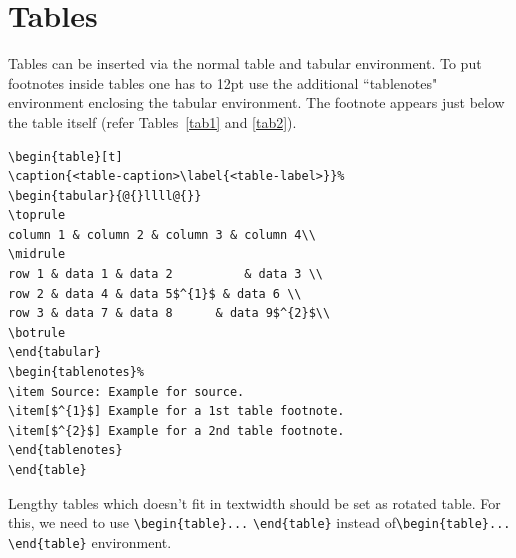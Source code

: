 \documentclass[numbers,webpdf]{ima-authoring-template}%
\theoremstyle{thmstyletwo}%
\numberwithin{equation}{section}
\begin{document}
\section{Tables}\label{sec5}

Tables can be inserted via the normal table and tabular environment. To put
footnotes inside tables one has to 12pt use the additional ``tablenotes" environment
enclosing the tabular environment. The footnote appears just below the table
itself (refer Tables~\ref{tab1} and \ref{tab2}).


\begin{verbatim}
\begin{table}[t]
\caption{<table-caption>\label{<table-label>}}%
\begin{tabular}{@{}llll@{}}
\toprule
column 1 & column 2 & column 3 & column 4\\
\midrule
row 1 & data 1 & data 2          & data 3 \\
row 2 & data 4 & data 5$^{1}$ & data 6 \\
row 3 & data 7 & data 8      & data 9$^{2}$\\
\botrule
\end{tabular}
\begin{tablenotes}%
\item Source: Example for source.
\item[$^{1}$] Example for a 1st table footnote.
\item[$^{2}$] Example for a 2nd table footnote.
\end{tablenotes}
\end{table}
\end{verbatim}


Lengthy tables which doesn't fit in textwidth should be set as rotated table. For this, we need to use \verb+\begin{table}...+ \verb+\end{table}+ instead of\break \verb+\begin{table}...+ \verb+\end{table}+ environment.
\end{document}
